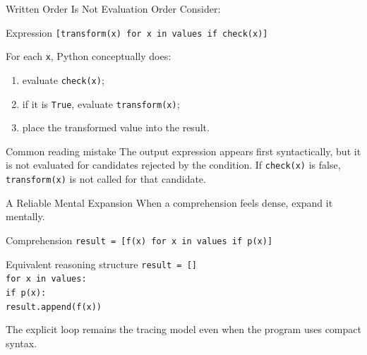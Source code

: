 \documentclass[aspectratio=169,10pt]{beamer}
\begin{document}
\begin{frame}{Written Order Is Not Evaluation Order}
  Consider:
  \begin{block}{Expression}
    \centering
    \texttt{[transform(x) for x in values if check(x)]}
  \end{block}

  For each \texttt{x}, Python conceptually does:
  \begin{enumerate}
    \item evaluate \texttt{check(x)};
    \item if it is \texttt{True}, evaluate \texttt{transform(x)};
    \item place the transformed value into the result.
  \end{enumerate}

  \begin{alertblock}{Common reading mistake}
    The output expression appears first syntactically, but it is not evaluated for candidates rejected by the condition. If \texttt{check(x)} is false, \texttt{transform(x)} is not called for that candidate.
  \end{alertblock}
\end{frame}

\begin{frame}{A Reliable Mental Expansion}
  When a comprehension feels dense, expand it mentally.

  \begin{block}{Comprehension}
    \texttt{result = [f(x) for x in values if p(x)]}
  \end{block}

  \begin{block}{Equivalent reasoning structure}
    \texttt{result = []}\\
    \texttt{for x in values:}\\
    \hspace{0.18in}\texttt{if p(x):}\\
    \hspace{0.36in}\texttt{result.append(f(x))}
  \end{block}

  \begin{keyidea}
    The explicit loop remains the tracing model even when the program uses compact syntax.
  \end{keyidea}
\end{frame}

\end{document}
